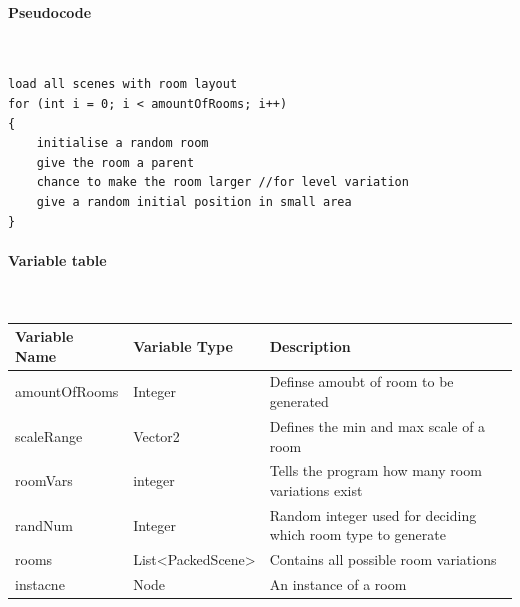 \documentclass{article}
\newcommand{\myparagraph}[1]{\paragraph{#1}\mbox{}\\} %
\newcommand{\smallBr}{\vspace{1.5mm}}
\begin{document}
\myparagraph{Pseudocode}
\begin{lstlisting}
load all scenes with room layout
for (int i = 0; i < amountOfRooms; i++)
{
	initialise a random room
	give the room a parent
	chance to make the room larger //for level variation
	give a random initial position in small area
}
\end{lstlisting}

\myparagraph{Variable table} 
\smallBr
\begin{tabular}{l|l|l}
\multicolumn{1}{l|}{Variable Name} & Variable Type                            & \multicolumn{1}{|l}{Description}                             \\ \hline
amountOfRooms                       & Integer                                  & Definse amoubt of room to be generated                       \\
scaleRange                          & Vector2                                  & Defines the min and max scale of a room                      \\
roomVars                            & integer                                  & Tells the program how many room variations exist             \\
randNum                             & Integer                                  & Random integer used for deciding which room type to generate \\
rooms                               & List\textless{}PackedScene\textgreater{} & Contains all possible room variations                        \\
instacne                            & Node                                     & An instance of a room                                       
\end{tabular}
\end{document}
